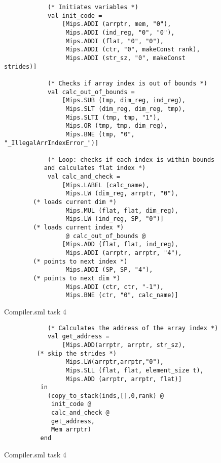 \documentclass[12pt,a4paper,english]{article}
\begin{document}
\begin{figure}[h]
\begin{lstlisting}
            (* Initiates variables *)
            val init_code =
                [Mips.ADDI (arrptr, mem, "0"),
                 Mips.ADDI (ind_reg, "0", "0"),
                 Mips.ADDI (flat, "0", "0"),
                 Mips.ADDI (ctr, "0", makeConst rank),
                 Mips.ADDI (str_sz, "0", makeConst strides)]

            (* Checks if array index is out of bounds *)
            val calc_out_of_bounds =
                [Mips.SUB (tmp, dim_reg, ind_reg),
                 Mips.SLT (dim_reg, dim_reg, tmp),
                 Mips.SLTI (tmp, tmp, "1"),
                 Mips.OR (tmp, tmp, dim_reg),
                 Mips.BNE (tmp, "0", "_IllegalArrIndexError_")]

            (* Loop: checks if each index is within bounds 
	       and calculates flat index *)
            val calc_and_check =
                [Mips.LABEL (calc_name),
                 Mips.LW (dim_reg, arrptr, "0"),    
		(* loads current dim *)
                 Mips.MUL (flat, flat, dim_reg), 
                 Mips.LW (ind_reg, SP, "0")]        
		(* loads current index *)
                 @ calc_out_of_bounds @
                [Mips.ADD (flat, flat, ind_reg), 
                 Mips.ADDI (arrptr, arrptr, "4"),   
		(* points to next index *)
                 Mips.ADDI (SP, SP, "4"),           
		(* points to next dim *)
                 Mips.ADDI (ctr, ctr, "-1"),
                 Mips.BNE (ctr, "0", calc_name)]
\end{lstlisting}
\caption{Compiler.sml task 4}\end{figure}
\begin{figure}[h]
\begin{lstlisting}
            (* Calculates the address of the array index *)
            val get_address =
                [Mips.ADD(arrptr, arrptr, str_sz),      
		 (* skip the strides *)
                 Mips.LW(arrptr,arrptr,"0"),
                 Mips.SLL (flat, flat, element_size t),
                 Mips.ADD (arrptr, arrptr, flat)]
          in
            (copy_to_stack(inds,[],0,rank) @
             init_code @
             calc_and_check @
             get_address,
             Mem arrptr)
          end    
\end{lstlisting}
\caption{Compiler.sml task 4}\end{figure}
\end{document}
